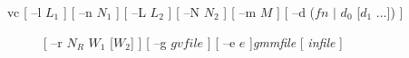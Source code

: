 \hypertarget{vc}{}
\def\vec#1{\mbox{\boldmath $#1$}}
\def\dim#1{^{(#1)}}
\def\inv{^{-1}}
\def\mid{\:|\:}
\def\trans{^{\top}}
\def\W{\Vec{W}}
\def\w{\Vec{w}}
\def\sX{\vec{\scriptstyle{X}}}
\def\sY{\vec{\scriptstyle{Y}}}
\def\sZ{\vec{\scriptstyle{Z}}}
\def\sm{\vec{\scriptstyle{m}}}
\def\sv{\vec{\scriptstyle{v}}}
\newcommand{\Sum}{\displaystyle\sum\limits}
\newcommand{\Prod}{\prod\limits}

\begin{synopsis}
\item[vc] [ --l $L_1$ ]  [ --n $N_1$ ]  [ --L $L_2$ ]  [ --N $N_2$ ]
           [ --m $M$ ]  [ --d ($fn$ $|$ $d_0$ [$d_1$ $\dots$]) ]
\item [\ ~~~~] [ --r $N_R$ $W_1$ [$W_2$] ] [ --g $gvfile$ ] [ --e $e$ ]{\em gmmfile}
 [ {\em infile} ]
\end{synopsis}

